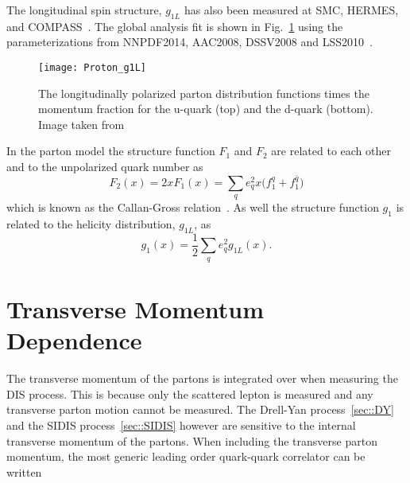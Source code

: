 The longitudinal spin structure, $g_{1L}$ has also been measured at SMC, HERMES,
and COMPASS~\cite{Adeva:1997is,PhysRevLett.92.012005,Savin:2011zz}.  The global
analysis fit is shown in Fig.~\ref{fig::Proton_g1L} using the parameterizations
from NNPDF2014, AAC2008, DSSV2008 and
LSS2010~\cite{Harland-Lang:2016yfn,Abt:2016vjh,Nocera:2014gqa,Hirai:2008aj}.

\begin{figure}[h!t]
  \centering \texttt{[image: Proton\_g1L]}
  \caption{The longitudinally polarized parton distribution functions times the
    momentum fraction for the u-quark (top) and the d-quark (bottom).  Image
    taken from~\cite{Tanabashi:2018oca}}
  \label{fig::Proton_g1L}
\end{figure}

In the parton model the structure function $F_1$ and $F_2$ are related to each
other and to the unpolarized quark number as
\begin{equation}
  F_2(x) = 2xF_1(x) = \sum_q e_q^2x\Big(f^q_1 + f^{\bar{q}}_1 \Big)
\end{equation}
which is known as the Callan-Gross relation~\cite{PhysRevLett.22.156}.  As well
the structure function $g_1$ is related to the helicity distribution, $g_{1L}$,
as
\begin{equation}
  g_1(x) = \frac{1}{2} \sum_q e^2_q g_{1L}(x).
\end{equation}


\section{Transverse Momentum Dependence}
The transverse momentum of the partons is integrated over when measuring the DIS
process.  This is because only the scattered lepton is measured and any
transverse parton motion cannot be measured.  The Drell-Yan
process~\ref{sec::DY} and the SIDIS process~\ref{sec::SIDIS} however are
sensitive to the internal transverse momentum of the partons.  When including
the transverse parton momentum, the most generic leading order quark-quark
correlator can be written~\cite{Mulders:1995dh,Boer:1997nt,Bacchetta:2006tn}


